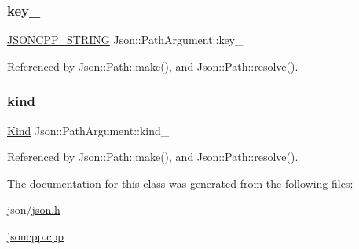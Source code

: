 \subsubsection{\texorpdfstring{key\+\_\+}{key\_}}
{\footnotesize\ttfamily \hyperlink{json_8h_a1e723f95759de062585bc4a8fd3fa4be_a1e723f95759de062585bc4a8fd3fa4be}{J\+S\+O\+N\+C\+P\+P\+\_\+\+S\+T\+R\+I\+NG} Json\+::\+Path\+Argument\+::key\+\_\+\hspace{0.3cm}{\ttfamily [private]}}



Referenced by Json\+::\+Path\+::make(), and Json\+::\+Path\+::resolve().

\mbox{\label{classJson_1_1PathArgument_ad4bc4b544b155a3d9c7788572ecf991b_ad4bc4b544b155a3d9c7788572ecf991b}} 
\subsubsection{\texorpdfstring{kind\+\_\+}{kind\_}}
{\footnotesize\ttfamily \hyperlink{classJson_1_1PathArgument_a2420bbad778573c147e578701b84d9b9_a2420bbad778573c147e578701b84d9b9}{Kind} Json\+::\+Path\+Argument\+::kind\+\_\+\hspace{0.3cm}{\ttfamily [private]}}



Referenced by Json\+::\+Path\+::make(), and Json\+::\+Path\+::resolve().



The documentation for this class was generated from the following files\+:\begin{DoxyCompactItemize}
\item 
json/\hyperlink{json_8h}{json.\+h}\item 
\hyperlink{jsoncpp_8cpp}{jsoncpp.\+cpp}\end{DoxyCompactItemize}

